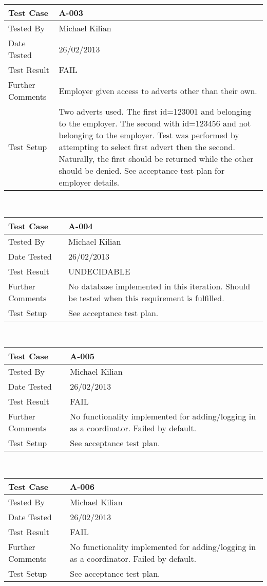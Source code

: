 \documentclass{l3deliverable}
\begin{document}
\begin{tabular}{lp{10cm}}
\hline 
\textbf{Test Case} & A-003\tabularnewline
\hline 
\hline 
Tested By & Michael Kilian\tabularnewline
\hline 
Date Tested & 26/02/2013\tabularnewline
\hline 
Test Result & FAIL\tabularnewline
\hline
Further Comments &  Employer given access to adverts other than their own. \tabularnewline
\hline
Test Setup &  Two adverts used. The first id=123001 and belonging to the employer. The second with id=123456 and not belonging to the employer. Test was performed by attempting to select first advert then the second. Naturally, the first should be returned while the other should be denied. See acceptance test plan for employer details. \tabularnewline
\hline
\end{tabular}\\

\begin{tabular}{lp{10cm}}
\hline 
\textbf{Test Case} & A-004\tabularnewline
\hline 
\hline 
Tested By & Michael Kilian\tabularnewline
\hline 
Date Tested & 26/02/2013\tabularnewline
\hline 
Test Result & UNDECIDABLE\tabularnewline
\hline
Further Comments &  No database implemented in this iteration. Should be tested when this requirement is fulfilled. \tabularnewline
\hline
Test Setup &  See acceptance test plan. \tabularnewline
\hline
\end{tabular}\\

\begin{tabular}{lp{10cm}}
\hline 
\textbf{Test Case} & A-005\tabularnewline
\hline 
\hline 
Tested By & Michael Kilian\tabularnewline
\hline 
Date Tested & 26/02/2013\tabularnewline
\hline 
Test Result & FAIL\tabularnewline
\hline
Further Comments &  No functionality implemented for adding/logging in as a coordinator. Failed by default. \tabularnewline
\hline
Test Setup &  See acceptance test plan. \tabularnewline
\hline
\end{tabular}\\

\begin{tabular}{lp{10cm}}
\hline 
\textbf{Test Case} & A-006\tabularnewline
\hline 
\hline 
Tested By & Michael Kilian\tabularnewline
\hline 
Date Tested & 26/02/2013\tabularnewline
\hline 
Test Result & FAIL\tabularnewline
\hline
Further Comments &  No functionality implemented for adding/logging in as a coordinator. Failed by default. \tabularnewline
\hline
Test Setup &  See acceptance test plan. \tabularnewline
\hline
\end{tabular}\\
\end{document}
